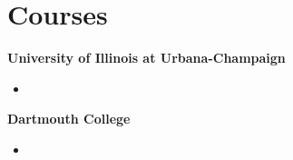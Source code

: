 \section{\sc Courses}
{\bf University of Illinois at Urbana-Champaign}\\

\begin{itemize}
\item
\end{itemize}



{\bf Dartmouth College}\\

\begin{itemize}
\item
\end{itemize}
